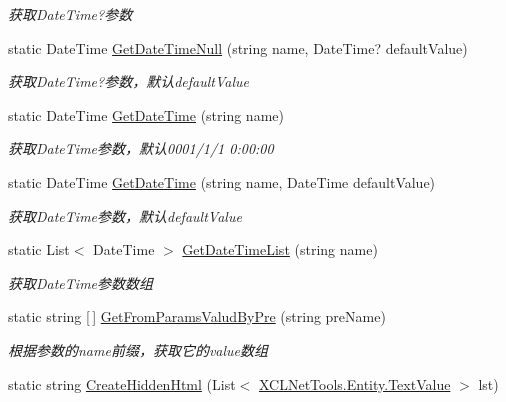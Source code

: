 \begin{DoxyCompactItemize}
\begin{DoxyCompactList}\small\item\em 获取\+Date\+Time?参数 \end{DoxyCompactList}\item 
static Date\+Time \hyperlink{class_x_c_l_net_tools_1_1_string_hander_1_1_form_helper_ab3e61d6c88439c4426de637f035f19de}{Get\+Date\+Time\+Null} (string name, Date\+Time? default\+Value)
\begin{DoxyCompactList}\small\item\em 获取\+Date\+Time?参数，默认default\+Value \end{DoxyCompactList}\item 
static Date\+Time \hyperlink{class_x_c_l_net_tools_1_1_string_hander_1_1_form_helper_ab9b36d4dac916c94303c01b1006bc558}{Get\+Date\+Time} (string name)
\begin{DoxyCompactList}\small\item\em 获取\+Date\+Time参数，默认\textquotesingle{}0001/1/1 0\+:00\+:00\textquotesingle{} \end{DoxyCompactList}\item 
static Date\+Time \hyperlink{class_x_c_l_net_tools_1_1_string_hander_1_1_form_helper_adf1ee0dea579cc0333567e9523070ce4}{Get\+Date\+Time} (string name, Date\+Time default\+Value)
\begin{DoxyCompactList}\small\item\em 获取\+Date\+Time参数，默认default\+Value \end{DoxyCompactList}\item 
static List$<$ Date\+Time $>$ \hyperlink{class_x_c_l_net_tools_1_1_string_hander_1_1_form_helper_a5f45de423709334dacacc84764ac9079}{Get\+Date\+Time\+List} (string name)
\begin{DoxyCompactList}\small\item\em 获取\+Date\+Time参数数组 \end{DoxyCompactList}\item 
static string \mbox{[}$\,$\mbox{]} \hyperlink{class_x_c_l_net_tools_1_1_string_hander_1_1_form_helper_a5b0bd096fa3caa418a65570579394201}{Get\+From\+Params\+Valud\+By\+Pre} (string pre\+Name)
\begin{DoxyCompactList}\small\item\em 根据参数的name前缀，获取它的value数组 \end{DoxyCompactList}\item 
static string \hyperlink{class_x_c_l_net_tools_1_1_string_hander_1_1_form_helper_ae6425dda60cd7288371433985e8edb00}{Create\+Hidden\+Html} (List$<$ \hyperlink{class_x_c_l_net_tools_1_1_entity_1_1_text_value}{X\+C\+L\+Net\+Tools.\+Entity.\+Text\+Value} $>$ lst)

\end{DoxyCompactItemize}
